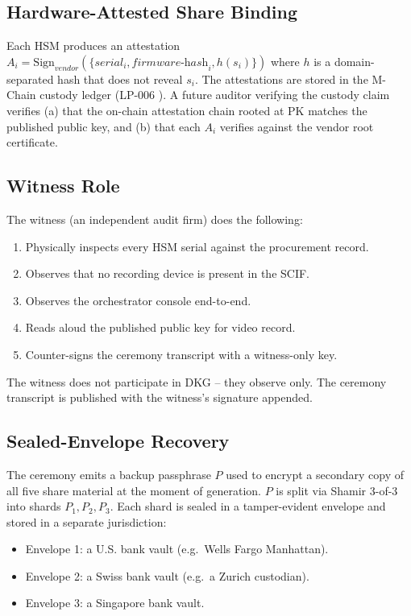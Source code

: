 \subsection{Hardware-Attested Share Binding}

Each HSM produces an attestation $A_i = \mathrm{Sign}_{vendor}(\{
\textit{serial}_i, \textit{firmware-hash}_i, h(s_i)\})$ where $h$ is
a domain-separated hash that does not reveal $s_i$. The attestations
are stored in the M-Chain custody ledger (LP-006 \cite{lp006}).
A future auditor verifying the custody claim verifies (a) that the
on-chain attestation chain rooted at $\mathrm{PK}$ matches the
published public key, and (b) that each $A_i$ verifies against the
vendor root certificate.

\subsection{Witness Role}

The witness (an independent audit firm) does the following:

\begin{enumerate}[nosep]
\item Physically inspects every HSM serial against the procurement
record.
\item Observes that no recording device is present in the SCIF.
\item Observes the orchestrator console end-to-end.
\item Reads aloud the published public key for video record.
\item Counter-signs the ceremony transcript with a witness-only key.
\end{enumerate}

The witness does not participate in DKG -- they observe only. The
ceremony transcript is published with the witness's signature
appended.

\subsection{Sealed-Envelope Recovery}

The ceremony emits a backup passphrase $P$ used to encrypt a
secondary copy of all five share material at the moment of generation.
$P$ is split via Shamir 3-of-3 into shards $P_1, P_2, P_3$. Each
shard is sealed in a tamper-evident envelope and stored in a separate
jurisdiction:

\begin{itemize}[nosep]
\item Envelope 1: a U.S. bank vault (e.g.\ Wells Fargo Manhattan).
\item Envelope 2: a Swiss bank vault (e.g.\ a Zurich custodian).
\item Envelope 3: a Singapore bank vault.
\end{itemize}

